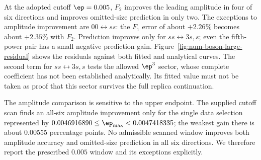 At the adopted cutoff $\ep=0.005$, $F_2$ improves the leading
amplitude in four of six directions and improves omitted-size
prediction in only two. The exceptions to amplitude improvement
are $00\leftrightarrow ss$: the $F_1$ error of about $+2.26\%$
becomes about $+2.35\%$ with $F_2$. Prediction improves only for
$ss\leftrightarrow3s,s$; even the fifth-power pair has a small
negative prediction gain. Figure~\ref{fig:num-boson-large-residual}
shows the residuals against both fitted and analytical curves.
The second term for $ss\leftrightarrow3s,s$ tests the allowed
$\ep^3$ sector, whose complete coefficient has not been established
analytically. Its fitted value must not be taken as proof that this
sector survives the full replica continuation.

The amplitude comparison is sensitive to the upper endpoint.
The supplied cutoff scan finds an all-six amplitude improvement
only for the single data selection represented by
$0.0046916890\leq\ep_{\max}<0.0047418335$; the weakest gain there
is about $0.00555$ percentage points. No admissible scanned window
improves both amplitude accuracy and omitted-size prediction in
all six directions. We therefore report the prescribed $0.005$
window and its exceptions explicitly.


\clearpage
